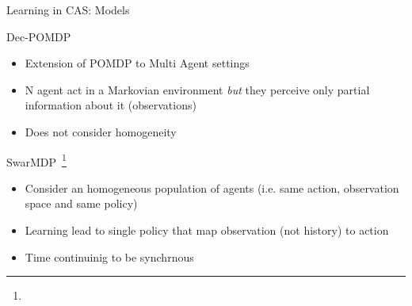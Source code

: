 \documentclass[presentation]{beamer}\mode<presentation>{\usetheme{AMSBolognaFC}}
\begin{document}
\begin{frame}{Learning in CAS: Models}
		
	\begin{exampleblock}{Dec-POMDP \href{http://rbr.cs.umass.edu/camato/decpomdp/overview.html}{\faLink}}
		\begin{itemize}
			\item Extension of POMDP to Multi Agent settings
			\item N agent act in a Markovian environment \emph{but} they perceive only partial information about it (observations)
			\item[\faExclamation] Does not consider homogeneity
		\end{itemize}
	\end{exampleblock}
	\begin{exampleblock}{SwarMDP~\footnote[frame]{}}
		\begin{itemize}
			\item Consider an homogeneous population of agents (i.e. same action, observation space and same policy)
			\item Learning lead to single policy that map observation (not history) to action
			\item[\faExclamation] Time continuinig to be synchrnous
		\end{itemize}
	\end{exampleblock}
\end{frame}
\end{document}
